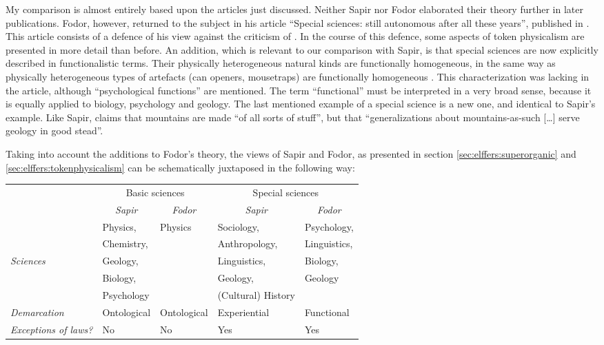 \documentclass[output=paper]{langscibook}
\begin{document}
My comparison is almost entirely based upon the articles just discussed. Neither Sapir nor Fodor elaborated their theory further in later publications. Fodor, however, returned to the subject in his article ``Special sciences: still autonomous after all these years'', published in \citeyear{Fodor1997}. This article consists of a defence of his view against the criticism of \citet{Kim1992}. In the course of this defence, some aspects of token physicalism are presented in more detail than before. An addition, which is relevant to our comparison with Sapir, is that special sciences are now explicitly described in functionalistic terms. Their physically heterogeneous natural kinds are functionally homogeneous, in the same way as physically heterogeneous types of artefacts (can openers, mousetraps) are functionally homogeneous \citet[160]{Fodor1997}. This characterization was lacking in the \citeyear{Fodor1974} article, although ``psychological functions'' are mentioned. The term ``functional'' must be interpreted in a very broad sense, because it is equally applied to biology, psychology and geology. The last mentioned example of a special science is a new one, and identical to Sapir's example. Like Sapir, \citet[160]{Fodor1997} claims that mountains are made ``of all sorts of stuff'', but that ``generalizations about mountains-as-such […] serve geology in good stead''.

Taking into account the \citeyear{Fodor1997} additions to Fodor's theory, the views of Sapir and Fodor, as presented in section \ref{sec:elffers:superorganic} and \ref{sec:elffers:tokenphysicalism} can be schematically juxtaposed in the following way:

\begin{tabular}{p{1.8cm}|p{2.2cm}|p{2.2cm}|p{2.2cm}|p{2.2cm}}
  \multirow{2}{*}{ } & \multicolumn{2}{c|}{Basic sciences} & \multicolumn{2}{c}{Special sciences} \\
  & \multicolumn{1}{c}{\emph{Sapir}} & \multicolumn{1}{c|}{\emph{Fodor}} & \multicolumn{1}{c}{\emph{Sapir}} & \multicolumn{1}{c}{\emph{Fodor}} \\ \hline
  & Physics, & Physics & Sociology, & Psychology, \\
  & Chemistry, & & Anthropology, & Linguistics, \\
  \emph{Sciences} & Geology, & & Linguistics, & Biology, \\
  & Biology, & & Geology, & Geology  \\
  & Psychology & & {(}Cultural{)} History & \\ \hline
 
 \emph{Demarcation} & Ontological & Ontological & Experiential & Functional \\ \hline
 
 \emph{Exceptions of laws?} & No & No & Yes & Yes \\
\end{tabular}
\end{document}
